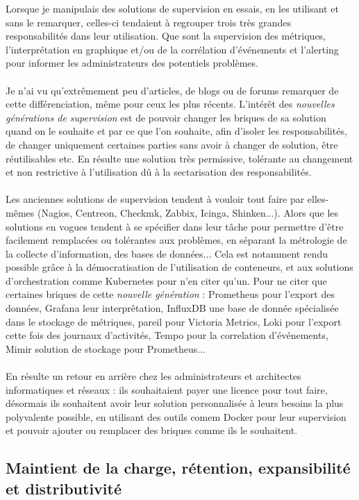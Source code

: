 Lorsque je manipulais des solutions de supervision en essais, en les utilisant et sans le remarquer, celles-ci tendaient à regrouper trois très grandes responsabilités dans leur utilisation. Que sont la supervision des métriques, l'interprétation en graphique et/ou de la corrélation d'événements et l'alerting pour informer les administrateurs des potentiels problèmes.
\\ \\
Je n'ai vu qu'extrêmement peu d'articles, de blogs ou de forums remarquer de cette différenciation, même pour ceux les plus récents. L'intérêt des \textit{nouvelles générations de supervision} est de pouvoir changer les briques de sa solution quand on le souhaite et par ce que l'on souhaite, afin d'isoler les responsabilités, de changer uniquement certaines parties sans avoir à changer de solution, être réutilisables etc. En résulte une solution très permissive, tolérante au changement et non restrictive à l'utilisation dû à la sectarisation des responsabilités.
\\ \\
Les anciennes solutions de supervision tendent à vouloir tout faire par elles-mêmes (Nagios, Centreon, Checkmk, Zabbix, Icinga, Shinken...). Alors que les solutions en vogues tendent à se spécifier dans leur tâche pour permettre d'être facilement remplacées ou tolérantes aux problèmes, en séparant la métrologie de la collecte d'information, des bases de données... Cela est notamment rendu possible grâce à la démocratisation de l'utilisation de conteneurs, et aux solutions d'orchestration comme Kubernetes pour n'en citer qu'un. Pour ne citer que certaines briques de cette \textit{nouvelle génération} : Prometheus pour l'export des données, Grafana leur interprêtation, InfluxDB une base de donnée spécialisée dans le stockage de métriques, pareil pour Victoria Metrics, Loki pour l'export cette fois des journaux d'activités, Tempo pour la correlation d'événements, Mimir solution de stockage pour Prometheus...
\\ \\
En résulte un retour en arrière chez les administrateurs et architectes informatiques et réseaux : ils souhaitaient payer une licence pour tout faire, désormais ils souhaitent avoir leur solution personnalisée à leurs besoins la plus polyvalente possible, en utilisant des outils comem Docker pour leur supervision et pouvoir ajouter ou remplacer des briques comme ils le souhaitent.

\subsection{Maintient de la charge, rétention, expansibilité et distributivité}

